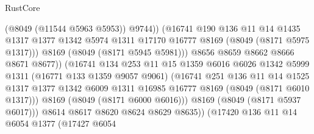 \begin{lexlean}{RustCore}
\begin{coremodule}
                                    (@8049 (@11544 @5963 @5953))
                                    @9744))
                                (@16741
                                  @190
                                  @136
                                  @11
                                  @14
                                  @1435
                                  @1317
                                  @1377
                                  @1342
                                  @5974
                                  @1311
                                  @17170
                                  @16777
                                  @8169
                                  (@8049 (@8171 @5975 @1317)))
                                @8169
                                (@8049 (@8171 @5945 @5981)))
                              @8656
                              @8659
                              @8662
                              @8666
                              @8671
                              @8677))
                          (@16741
                            @134
                            @253
                            @11
                            @15
                            @1359
                            @6016
                            @6026
                            @1342
                            @5999
                            @1311
                            (@16771 @133 @1359 @9057 @9061)
                            (@16741
                              @251
                              @136
                              @11
                              @14
                              @1525
                              @1317
                              @1377
                              @1342
                              @6009
                              @1311
                              @16985
                              @16777
                              @8169
                              (@8049 (@8171 @6010 @1317)))
                            @8169
                            (@8049 (@8171 @6000 @6016)))
                          @8169
                          (@8049 (@8171 @5937 @6017)))
                        @8614
                        @8617
                        @8620
                        @8624
                        @8629
                        @8635))
                    (@17420
                      @136
                      @11
                      @14
                      @6054
                      @1377
                      (@17427
                        @6054

\end{coremodule}
\end{lexlean}
